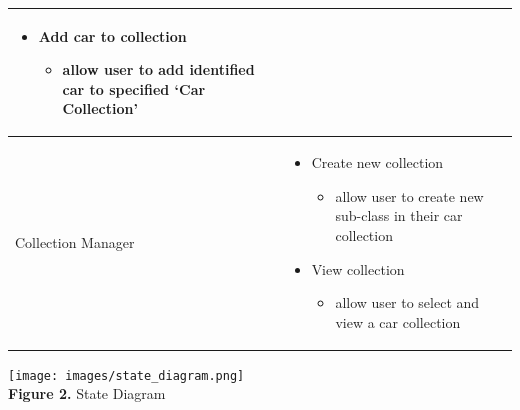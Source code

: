 \documentclass[]{article}
\begin{document}
\begin{tabular}{|p{3cm}|p{13cm}|}
\begin{itemize} [left=2pt]
\begin{itemize}
		\end{itemize}
		\item Add car to collection
		\begin{itemize}
			\item allow user to add identified car to specified ‘Car Collection’
		\end{itemize}
	\end{itemize} \\
	\hline
	Collection Manager &
	\begin{itemize} [left=2pt]
		\item Create new collection
		\begin{itemize}
			\item allow user to create new sub-class in their car collection
		\end{itemize}
		\item View collection
		\begin{itemize}
			\item allow user to select and view a car collection
		\end{itemize}
	\end{itemize} \\
	\hline
\end{tabular}

\begin{center}
	\texttt{[image: images/state\_diagram.png]} \\
	\textbf{Figure 2. } State Diagram
\end{center}
\end{document}
